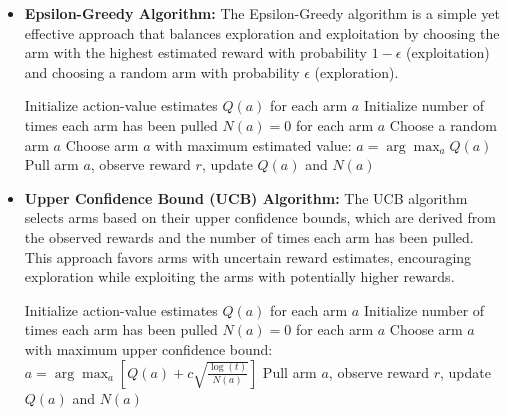 \documentclass[12pt]{book} %
\begin{document}
\begin{itemize}
    \item \textbf{Epsilon-Greedy Algorithm:} The Epsilon-Greedy algorithm is a simple yet effective approach that balances exploration and exploitation by choosing the arm with the highest estimated reward with probability \(1-\epsilon\) (exploitation) and choosing a random arm with probability \(\epsilon\) (exploration).
    \FloatBarrier
\begin{algorithm}
\caption{Epsilon-Greedy Algorithm}
\begin{algorithmic}[1]
    \State Initialize action-value estimates $Q(a)$ for each arm $a$
    \State Initialize number of times each arm has been pulled $N(a) = 0$ for each arm $a$
            \State Choose a random arm $a$
        \Else
            \State Choose arm $a$ with maximum estimated value: $a = \arg\max_a Q(a)$
        \EndIf
        \State Pull arm $a$, observe reward $r$, update $Q(a)$ and $N(a)$
    \EndFor
\EndProcedure
\end{algorithmic}
\end{algorithm}
\FloatBarrier
    
    \item \textbf{Upper Confidence Bound (UCB) Algorithm:} The UCB algorithm selects arms based on their upper confidence bounds, which are derived from the observed rewards and the number of times each arm has been pulled. This approach favors arms with uncertain reward estimates, encouraging exploration while exploiting the arms with potentially higher rewards.

    \FloatBarrier
\begin{algorithm}
\caption{Upper Confidence Bound (UCB) Algorithm}
\begin{algorithmic}[1]
    \State Initialize action-value estimates $Q(a)$ for each arm $a$
    \State Initialize number of times each arm has been pulled $N(a) = 0$ for each arm $a$
        \State Choose arm $a$ with maximum upper confidence bound: $a = \arg\max_a [Q(a) + c \sqrt{\frac{\log(t)}{N(a)}}]$
        \State Pull arm $a$, observe reward $r$, update $Q(a)$ and $N(a)$
    \EndFor
\EndProcedure
\end{algorithmic}
\end{algorithm}
\FloatBarrier
    

\end{itemize}
\end{document}
